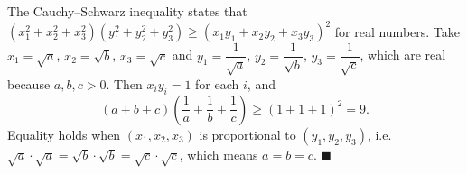 The Cauchy--Schwarz inequality states that $(x_1^2+x_2^2+x_3^2)(y_1^2+y_2^2+y_3^2)\ge(x_1y_1+x_2y_2+x_3y_3)^2$ for real numbers. Take $x_1=\sqrt a$, $x_2=\sqrt b$, $x_3=\sqrt c$ and $y_1=\dfrac{1}{\sqrt a}$, $y_2=\dfrac{1}{\sqrt b}$, $y_3=\dfrac{1}{\sqrt c}$, which are real because $a,b,c>0$. Then $x_iy_i=1$ for each $i$, and
\[(a+b+c)\left(\dfrac{1}{a}+\dfrac{1}{b}+\dfrac{1}{c}\right)\ge(1+1+1)^2=9 .\]
Equality holds when $(x_1,x_2,x_3)$ is proportional to $(y_1,y_2,y_3)$, i.e.\ $\sqrt a\cdot\sqrt a=\sqrt b\cdot\sqrt b=\sqrt c\cdot\sqrt c$, which means $a=b=c$. $\blacksquare$
